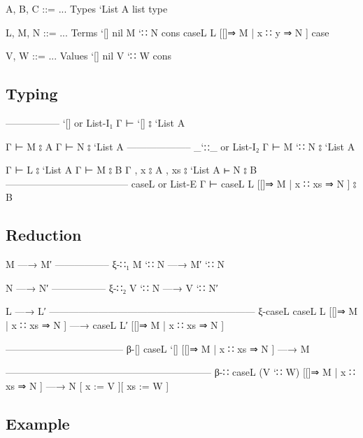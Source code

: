 \begin{myDisplay}
A, B, C ::= ...                     Types
  `List A                             list type

L, M, N ::= ...                     Terms
  `[]                                 nil
  M `∷ N                              cons
  caseL L [[]⇒ M | x ∷ y ⇒ N ]        case

V, W ::= ...                        Values
  `[]                                 nil
  V `∷ W                              cons
\end{myDisplay}

\hypertarget{typing-8}{%
\subsection{Typing}\label{typing-8}}

\begin{myDisplay}
----------------- `[] or List-I₁
Γ ⊢ `[] ⦂ `List A

Γ ⊢ M ⦂ A
Γ ⊢ N ⦂ `List A
-------------------- _`∷_ or List-I₂
Γ ⊢ M `∷ N ⦂ `List A

Γ ⊢ L ⦂ `List A
Γ ⊢ M ⦂ B
Γ , x ⦂ A , xs ⦂ `List A ⊢ N ⦂ B
-------------------------------------- caseL or List-E
Γ ⊢ caseL L [[]⇒ M | x ∷ xs ⇒ N ] ⦂ B
\end{myDisplay}

\hypertarget{reduction-8}{%
\subsection{Reduction}\label{reduction-8}}

\begin{myDisplay}
M —→ M′
----------------- ξ-∷₁
M `∷ N —→ M′ `∷ N

N —→ N′
----------------- ξ-∷₂
V `∷ N —→ V `∷ N′

L —→ L′
--------------------------------------------------------------- ξ-caseL
caseL L [[]⇒ M | x ∷ xs ⇒ N ] —→ caseL L′ [[]⇒ M | x ∷ xs ⇒ N ]

------------------------------------ β-[]
caseL `[] [[]⇒ M | x ∷ xs ⇒ N ] —→ M

--------------------------------------------------------------- β-∷
caseL (V `∷ W) [[]⇒ M | x ∷ xs ⇒ N ] —→ N [ x := V ][ xs := W ]
\end{myDisplay}

\hypertarget{example-8}{%
\subsection{Example}\label{example-8}}

